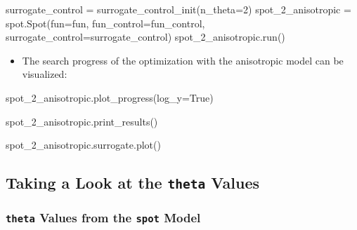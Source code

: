 \documentclass[
  letterpaper,
  DIV=11,
  numbers=noendperiod]{scrreprt}
\newenvironment{Shaded}{\begin{snugshade}}{\end{snugshade}}
\newcommand{\DecValTok}[1]{\textcolor[rgb]{0.68,0.00,0.00}{#1}}
\newcommand{\NormalTok}[1]{\textcolor[rgb]{0.00,0.23,0.31}{#1}}
\newcommand{\OperatorTok}[1]{\textcolor[rgb]{0.37,0.37,0.37}{#1}}
\newcommand{\VariableTok}[1]{\textcolor[rgb]{0.07,0.07,0.07}{#1}}
\providecommand{\tightlist}{%
  \setlength{\itemsep}{0pt}\setlength{\parskip}{0pt}}\usepackage{longtable,booktabs,array}
\begin{document}
\begin{Shaded}
\begin{Highlighting}[]
\NormalTok{surrogate\_control }\OperatorTok{=}\NormalTok{ surrogate\_control\_init(n\_theta}\OperatorTok{=}\DecValTok{2}\NormalTok{)}
\NormalTok{spot\_2\_anisotropic }\OperatorTok{=}\NormalTok{ spot.Spot(fun}\OperatorTok{=}\NormalTok{fun,}
\NormalTok{                    fun\_control}\OperatorTok{=}\NormalTok{fun\_control,}
\NormalTok{                    surrogate\_control}\OperatorTok{=}\NormalTok{surrogate\_control)}
\NormalTok{spot\_2\_anisotropic.run()}
\end{Highlighting}
\end{Shaded}

\begin{itemize}
\tightlist
\item
  The search progress of the optimization with the anisotropic model can
  be visualized:
\end{itemize}

\begin{Shaded}
\begin{Highlighting}[]
\NormalTok{spot\_2\_anisotropic.plot\_progress(log\_y}\OperatorTok{=}\VariableTok{True}\NormalTok{)}
\end{Highlighting}
\end{Shaded}

\begin{Shaded}
\begin{Highlighting}[]
\NormalTok{spot\_2\_anisotropic.print\_results()}
\end{Highlighting}
\end{Shaded}

\begin{Shaded}
\begin{Highlighting}[]
\NormalTok{spot\_2\_anisotropic.surrogate.plot()}
\end{Highlighting}
\end{Shaded}

\subsection{\texorpdfstring{Taking a Look at the \texttt{theta}
Values}{Taking a Look at the theta Values}}\label{taking-a-look-at-the-theta-values}

\subsubsection{\texorpdfstring{\texttt{theta} Values from the
\texttt{spot}
Model}{theta Values from the spot Model}}\label{theta-values-from-the-spot-model}
\end{document}
